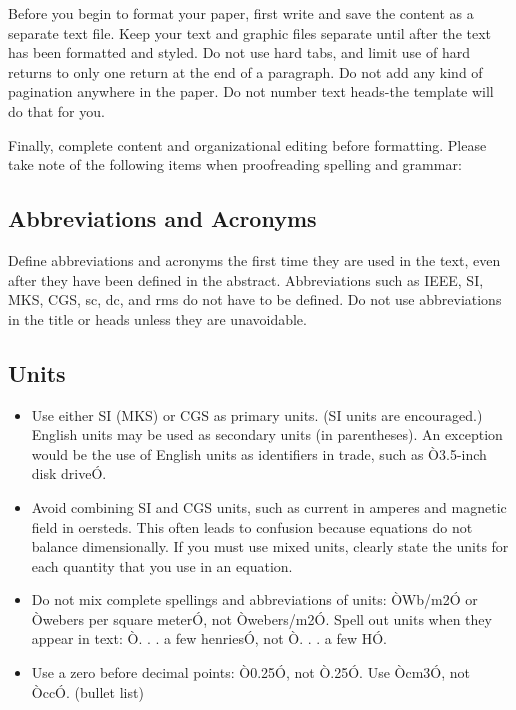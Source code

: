 \documentclass[letterpaper, 10 pt, conference]{ieeeconf}  %
\begin{document}
Before you begin to format your paper, first write and save the content as a separate text file. Keep your text and graphic files separate until after the text has been formatted and styled. Do not use hard tabs, and limit use of hard returns to only one return at the end of a paragraph. Do not add any kind of pagination anywhere in the paper. Do not number text heads-the template will do that for you.

Finally, complete content and organizational editing before formatting. Please take note of the following items when proofreading spelling and grammar:

\subsection{Abbreviations and Acronyms} Define abbreviations and acronyms the first time they are used in the text, even after they have been defined in the abstract. Abbreviations such as IEEE, SI, MKS, CGS, sc, dc, and rms do not have to be defined. Do not use abbreviations in the title or heads unless they are unavoidable.

\subsection{Units}

\begin{itemize}

\item Use either SI (MKS) or CGS as primary units. (SI units are encouraged.) English units may be used as secondary units (in parentheses). An exception would be the use of English units as identifiers in trade, such as Ò3.5-inch disk driveÓ.
\item Avoid combining SI and CGS units, such as current in amperes and magnetic field in oersteds. This often leads to confusion because equations do not balance dimensionally. If you must use mixed units, clearly state the units for each quantity that you use in an equation.
\item Do not mix complete spellings and abbreviations of units: ÒWb/m2Ó or Òwebers per square meterÓ, not Òwebers/m2Ó.  Spell out units when they appear in text: Ò. . . a few henriesÓ, not Ò. . . a few HÓ.
\item Use a zero before decimal points: Ò0.25Ó, not Ò.25Ó. Use Òcm3Ó, not ÒccÓ. (bullet list)

\end{itemize}
\end{document}

